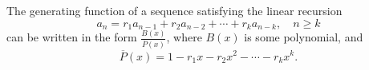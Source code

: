 

\setcounter{section}{2}
\setcounter{subsection}{3}
\setcounter{dfn}{9}

\begin{thm}
The generating function of a sequence satisfying the linear recursion
\[
a_n = r_1 a_{n-1} + r_2 a_{n-2} + \cdots + r_k a_{n-k}, \quad n \ge k
\]
can be written in the form $\frac{B(x)}{\overline{P}(x)}$, where $B(x)$ is some polynomial, and
\[
\overline{P}(x) = 1 - r_1 x - r_2 x^2 - \cdots - r_k x^k.
\]
\end{thm}


